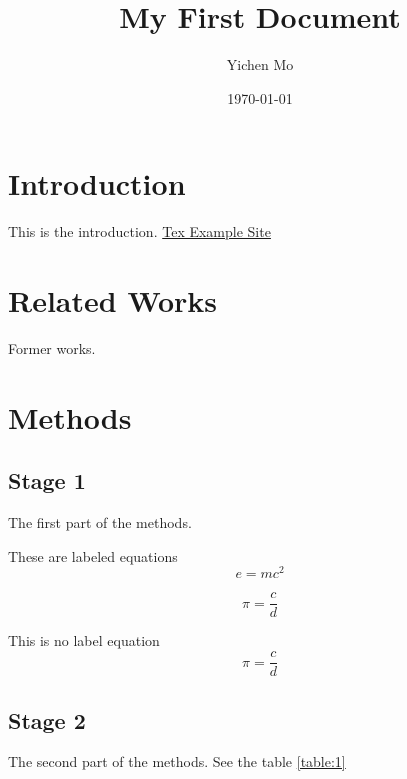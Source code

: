 \documentclass[a4paper,12pt]{article}
\begin{document}
\title{My First Document}
\author{Yichen Mo}
\date{\today}
\maketitle

\tableofcontents
\newpage
{} %


\section{Introduction}
This is the introduction.
\href{http://www.texample.net/tikz/resources/}{Tex Example Site}

\section{Related Works}
Former works.\cite{Birdetal2001}

\section{Methods}

\subsection{Stage 1}
The first part of the methods.


These are labeled equations
\begin{equation}
    e = mc^2
\end{equation}

\begin{equation}
    \pi = \frac{c}{d}
\end{equation}

This is no label equation
\begin{equation*}
    \pi = \frac{c}{d}
\end{equation*}

\subsection{Stage 2}
The second part of the methods. See the table \ref{table:1}
\end{document}
